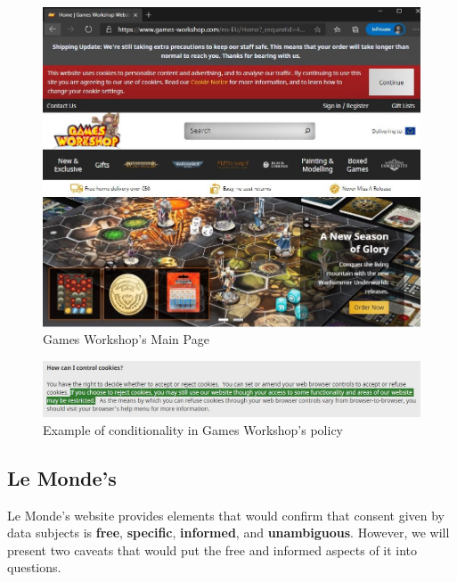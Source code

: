 \documentclass[twocolumn, letterpaper]{scrartcl}
\begin{document}
 		\begin{figure}
    		\includegraphics[width=0.95\linewidth]{gw_website.JPG}
     		\caption{Games Workshop's Main Page \label{fig:a}}
     	\end{figure}
    
        \begin{figure}[tbp]	
            \includegraphics[width=0.95\linewidth]{conditionality.JPG}
            \caption{Example of conditionality in Games Workshop's policy \label{fig:b}}
        \end{figure}
        
	\subsection*{Le Monde's}

    	Le Monde's website provides elements that would confirm that consent given by data subjects is \textbf{free}, \textbf{specific}, \textbf{informed}, and \textbf{unambiguous}. However, we will present two caveats that would put the free and informed aspects of it into questions. 
        
\end{document}
